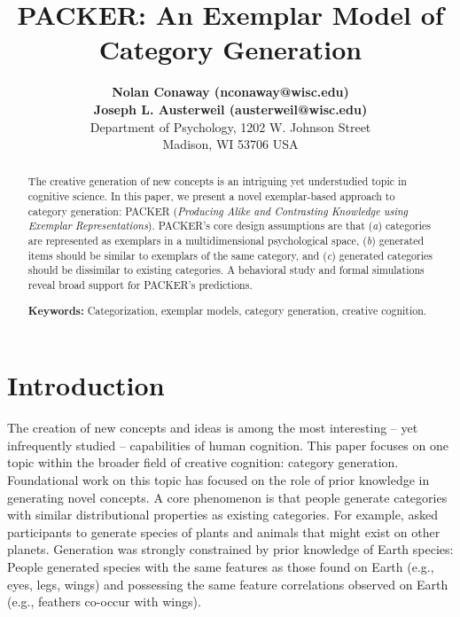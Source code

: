 \documentclass[10pt,letterpaper]{article}
\title{PACKER: An Exemplar Model of Category Generation}
\author{
{ \large \bf Nolan Conaway (nconaway@wisc.edu) } \\
{ \large \bf Joseph L. Austerweil (austerweil@wisc.edu) } \\
Department of Psychology, 1202 W. Johnson Street \\
Madison, WI 53706 USA
}
\begin{document}
\maketitle

\begin{abstract}

The creative generation of new concepts is an intriguing yet understudied topic in cognitive science. In this paper, we present a novel exemplar-based approach to category generation: PACKER (\textit{Producing Alike and Contrasting Knowledge using Exemplar Representations}). PACKER's core design assumptions are that (\textit{a}) categories are represented as exemplars in a multidimensional psychological space, (\textit{b}) generated items should be similar to exemplars of the same category, and (\textit{c}) generated categories should be dissimilar to existing categories. A behavioral study and formal simulations reveal broad support for PACKER's predictions.

\textbf{Keywords:} 
Categorization, exemplar models, category generation, creative cognition.
\end{abstract}

\section{Introduction}

The creation of new concepts and ideas is among the most interesting -- yet infrequently studied -- capabilities of human cognition. This paper focuses on one topic within the broader field of creative cognition: category generation. Foundational work on this topic \citep[e.g.,][]{smith1993constraining,ward2002role,ward1994structured,ward1995s} has focused on the role of prior knowledge in generating novel concepts. A core phenomenon is that people generate categories with similar distributional properties as existing categories. For example, \citet{ward1994structured} asked participants to generate species of plants and animals that might exist on other planets. Generation was strongly constrained by prior knowledge of Earth species: People generated species with the same features as those found on Earth (e.g., eyes, legs, wings) and possessing the same feature correlations observed on Earth (e.g., feathers co-occur with wings). 
\end{document}
